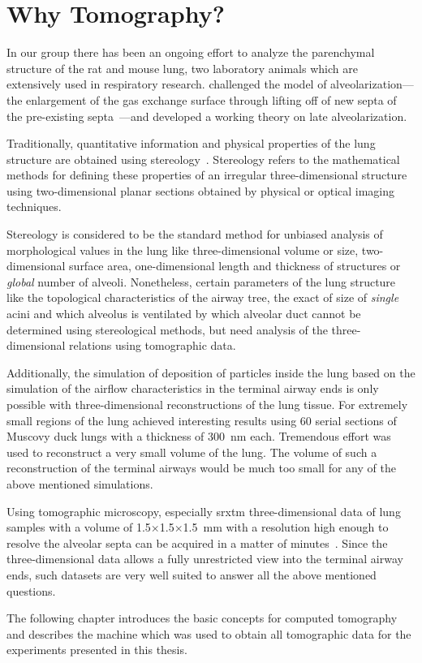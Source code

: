 \section{Why Tomography?}
In our group there has been an ongoing effort to analyze the parenchymal structure of the rat and mouse lung, two laboratory animals which are extensively used in respiratory research. \citet{Mund2008} challenged the model of alveolarization---the enlargement of the gas exchange surface through lifting off of new septa of the pre-existing septa~\cite{Burri1974}---and developed a working theory on late alveolarization.

Traditionally, quantitative information and physical properties of the lung structure are obtained using stereology~\cite{Ochs2006}. Stereology refers to the mathematical methods for defining these properties of an irregular three-dimensional structure using two-dimensional planar sections obtained by physical or optical imaging techniques\cite{Hsia2010}.

Stereology is considered to be the standard method for unbiased analysis of morphological values in the lung like three-dimensional volume or size, two-dimensional surface area, one-dimensional length and thickness of structures or \textit{global} number of alveoli. Nonetheless, certain parameters of the lung structure like the topological characteristics of the airway tree, the exact of size of \textit{single} acini and which alveolus is ventilated by which alveolar duct cannot be determined using stereological methods, but need analysis of the three-dimensional relations using tomographic data.

Additionally, the simulation of deposition of particles inside the lung based on the simulation of the airflow characteristics in the terminal airway ends is only possible with three-dimensional reconstructions of the lung tissue. For extremely small regions of the lung \citet{Woodward2005} achieved interesting results using 60 serial sections of Muscovy duck lungs with a thickness of \SI{300}{\nano\meter} each. Tremendous effort was used to reconstruct a very small volume of the lung. The volume of such a reconstruction of the terminal airways would be much too small for any of the above mentioned simulations.

Using tomographic microscopy, especially \ac{srxtm} three-dimensional data of lung samples with a volume of 1.5$\times$1.5$\times$\SI{1.5}{\milli\meter} with a resolution high enough to resolve the alveolar septa can be acquired in a matter of minutes~\cite{Hintermueller2010}. Since the three-dimensional data allows a fully unrestricted view into the terminal airway ends, such datasets are very well suited to answer all the above mentioned questions.

The following chapter introduces the basic concepts for computed tomography and describes the machine which was used to obtain all tomographic data for the experiments presented in this thesis.